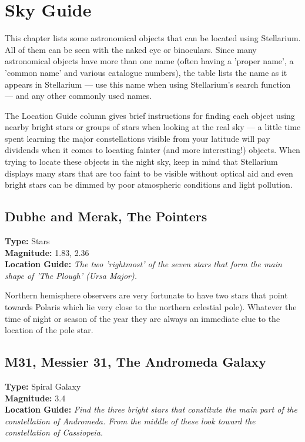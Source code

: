 
\chapter{Sky Guide}\label{sky-guide}

This chapter lists some astronomical objects that can be located using
Stellarium. All of them can be seen with the naked eye or binoculars.
Since many astronomical objects have more than one name (often having a
'proper name', a 'common name' and various catalogue numbers), the table
lists the name as it appears in Stellarium --- use this name when using
Stellarium's search function --- and any other commonly used names.

The Location Guide column gives brief instructions for finding each
object using nearby bright stars or groups of stars when looking at the
real sky --- a little time spent learning the major constellations
visible from your latitude will pay dividends when it comes to locating
fainter (and more interesting!) objects. When trying to locate these
objects in the night sky, keep in mind that Stellarium displays many
stars that are too faint to be visible without optical aid and even
bright stars can be dimmed by poor atmospheric conditions and light
pollution.

\section{Dubhe and Merak, The Pointers}
\textbf{Type:} Stars \\
\textbf{Magnitude:} 1.83, 2.36 \\
\textbf{Location Guide:} \textit{The two 'rightmost' of the seven stars that form the main shape of 'The Plough' (Ursa Major).} 

Northern hemisphere observers are very fortunate to have two stars that point towards Polaris which lie very close to the northern celestial pole). Whatever the time of night or season of the year they are always an immediate clue to the location of the pole star. 

\section{M31, Messier 31, The Andromeda Galaxy}
\textbf{Type:} Spiral Galaxy \\
\textbf{Magnitude:} 3.4 \\ 
\textbf{Location Guide:} \textit{Find the three bright stars that constitute the main part of the constellation of Andromeda. From the middle of these look toward the constellation of Cassiopeia.}

